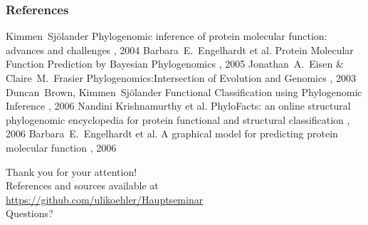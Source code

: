 \documentclass[14pt,xcolor=dvipsnames,pdftex]{beamer}
\begin{document}
\begin{frame}
  \frametitle<presentation>{References}    
  \begin{thebibliography}{10}
  \tiny
  \beamertemplatearticlebibitems
  \bibitem{}
    Kimmen~Sjölander
    \newblock Phylogenomic inference of protein molecular function: advances and challenges
    , 2004
  \bibitem{}
    Barbara~E.~Engelhardt et al.
    \newblock Protein Molecular Function Prediction by Bayesian Phylogenomics
    , 2005
  \bibitem{}
    Jonathan~A.~Eisen \& Claire~M.~Frasier
    \newblock Phylogenomics:Intersection of Evolution and Genomics
    , 2003
  \bibitem{}
    Duncan~Brown, Kimmen~Sjölander
    \newblock Functional Classification using Phylogenomic Inference
    , 2006
  \bibitem{}
    Nandini Krishnamurthy et al.
    \newblock PhyloFacts: an online structural phylogenomic encyclopedia for protein functional and structural classification
    , 2006
  \bibitem{}
    Barbara~E.~Engelhardt et al.
    \newblock A graphical model for predicting protein molecular function
    , 2006
  \end{thebibliography}
\end{frame}

\begin{frame}
 \begin{center}
 {\color{BlueViolet}\large Thank you for your attention!}\\[1cm]
 {\small References and sources available at}\\
 {\small \url{https://github.com/ulikoehler/Hauptseminar}}\\[1cm]
 {\color{BlueViolet}\large Questions?}\\[1cm]
 \end{center}
\end{frame}
\end{document}
